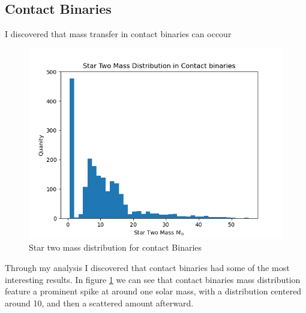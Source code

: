 \documentclass[12pt, a4paper]{article}
\begin{document}
            

        \subsection{\centering Contact Binaries}
            I discovered that mass transfer in contact binaries can occour 
        \begin{figure}[H]
            \centering
            \includegraphics[scale = .6]{figs/GeneratedFigs/Contact binaries Star Two Mass Distribution.png}
            \caption{Star two mass distribution for contact Binaries}
            \label{contactBinaryStar2MassDistro}
        \end{figure}

        Through my analysis I discovered that contact binaries had some of the most interesting results. 
        In figure \ref{contactBinaryStar2MassDistro} we can see that contact binaries mass distribution feature a prominent spike at around one solar mass, with a distribution centered around 10, and then a scattered amount afterward. 
\end{document}
